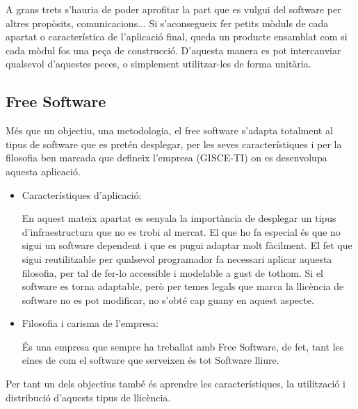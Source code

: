 \documentclass[letterpaper,11pt,catalan]{sphinxmanual}
\begin{document}
A grans trets s'hauria de poder aprofitar la part que es vulgui del software per altres propòsits,
comunicacions... Si s'aconsegueix fer petits mòduls de cada apartat o característica
de l'aplicació final, queda un producte ensamblat com si cada mòdul fos una peça de
construcció. D'aquesta manera es pot intercanviar qualsevol d'aquestes peces, o simplement utilitzar-les
de forma unitària.



\subsection{Free Software}
\label{\detokenize{index:free-software}}
Més que un objectiu, una metodologia, el free software s'adapta totalment al tipus de
software que es pretén desplegar, per les seves característiques i per la filosofia
ben marcada que defineix l'empresa (GISCE-TI) on es desenvolupa aquesta aplicació.
\begin{itemize}
\item {} 
Característiques d'aplicació:

En aquest mateix apartat es senyala la importància de
desplegar un tipus d'infraestructura que no es trobi al mercat. El que ho fa especial és
que no sigui un software dependent i que es pugui adaptar molt fàcilment. El fet que
sigui reutilitzable per qualsevol programador fa necessari aplicar aquesta filosofia,
per tal de fer-lo accessible i \sphinxquotedblleft{}modelable\sphinxquotedblright{} a gust de tothom. Si el software es torna adaptable,
però per temes legals que marca la llicència de software no es pot modificar, no s'obté
cap guany en aquest aspecte.

\item {} 
Filosofia i carisma de l'empresa:

És una empresa que sempre ha treballat amb Free Software,
de fet, tant les eines de  com el software que serveixen és tot Software lliure.

\end{itemize}

Per tant un dels objectius també és aprendre les característiques, la utilització i distribució
d'aquests tipus de llicència.

\begin{sphinxVerbatim}[commandchars=\\\{\}]
    
\end{sphinxVerbatim}
\end{document}
